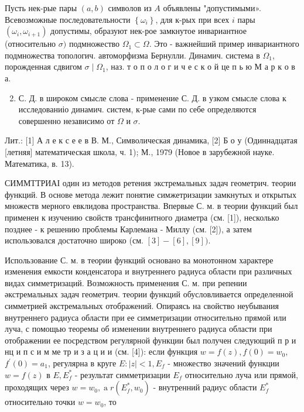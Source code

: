 \documentclass[10pt]{article}
\begin{document}
Пусть нек-рые пары $(a, b)$ символов из $A$ объявлены "допустимыми». Всевозможные последовательности $\left\{\omega_{i}\right\}$, для к-рых при всех $i$ пары $\left(\omega_{i}, \omega_{i+1}\right)$ допустимы, образуют нек-рое замкнутое инвариантное (относительно $\sigma)$ подмножество $\Omega_{1} \subset \Omega$. Это - важнейший пример инвариантного подмножества топологич. автоморфизма Бернулли. Динамич. система в $\Omega_{1}$, порожденная сдвигом $\sigma \mid \Omega_{1}$, наз. т о п о л о г и ч е с к о й це п ь ю М а р к о в а.



\begin{enumerate}

  \setcounter{enumi}{1}

  \item С. Д. в широком смысле слова - применение С. Д. в узком смысле слова к исследованиіо динамич. систем, к-рые сами по себе определяются совершенно независимо от $\Omega$ и $\sigma$.

\end{enumerate}



Лит.: [1] А л е к с е е в В. М., Символическая динамика, [2] Б о у (Одиннадцатая [летняя] математическая школа, ч. 1); М., 1979 (Новое в зарубежной науке. Математика, в. 13).



СИММТТРИАІ один из методов ретения экстремальных задач геометрич. теории функций. В основе метода лежит понятие симжетризации замкнутых и открытых множеств мерного евклидова пространства. Впервые С. м. в теории функций был применен к изучению свойств трансфинитного диаметра (см. [1]), несколько позднее - к решению проблемы Карлемана - Миллу (см. [2]), а затем использовался достаточно широко (см. $[3]-[6],[9])$.



Использование С. м. в теории функций основано ва монотонном характере изменения емкости конденсатора и внутреннего радиуса области при различных видах симметризаций. Возможность применения С. м. при репении әкстремальных задач геометрич. теории функций обусловливается определенной симметрией әкстремальных отображений. Опираясь на свойство неубывания внутреннего радиуса области при ее симметризации относительно прямой или луча, с помощью теоремы об изменении внутреннего радиуса области при отображении ее посредством регулярной функции был получен следующий п р и нц и п с и м ме тр и з а ц и и (см. [4]): если функция $w=f(z), f(0)=w_{0}$, $f^{\prime}(0)=a_{1}$, регулярна в круге $E:|z|<1, E_{f}$ - множество значений функции $w=f(z)$ в $E, E_{f}^{*}$ - результат симметризации $E_{f}$ относительно луча или прямой, проходящих через $w=w_{0}, \operatorname{a} r\left(E_{f}^{*}, w_{0}\right)$ - внутренний радиус области $E_{f}^{*}$ относительно точки $w=w_{0}$, то
\end{document}
